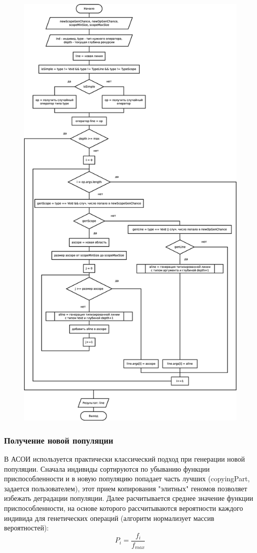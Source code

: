 \documentclass[russian,utf8,emptystyle]{eskdtext}
\begin{document}
\begin{spacing}{1.5}
\clearpage
\begin{figure}[h!]
\centering
\includegraphics[height=1.0\textheight]{generate_typed_line_alg.eps}
\end{figure}
\clearpage

\newpage
\subsubsection{Получение новой популяции}
В АСОИ используется практически классический подход при генерации новой популяции. Сначала индивиды сортируются по убыванию функции приспособленности и в новую популяцию попадает часть лучших (copyingPart, задается пользователем), этот прием копирования "элитных" геномов позволяет избежать деградации популяции. Далее расчитывается среднее значение функции приспособленности, на основе которого рассчитываются вероятности каждого индивида для генетических операций (алгоритм нормализует массив вероятностей):
$$
P_i = \frac{f_i}{f_{max}}
$$


\end{spacing}
\end{document}
